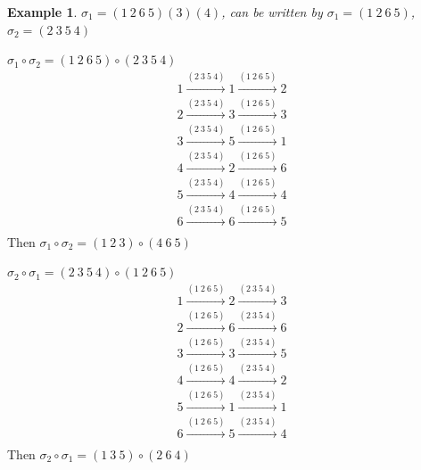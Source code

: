 \documentclass[11pt,a4paper]{article}
\newtheorem{example}{Example}
\begin{document}
\begin{example}
$\sigma_1=(1\ 2\ 6\ 5)(3)(4)$, can be written by $\sigma_1=(1\ 2\ 6\ 5)$, $\sigma_2=(2\ 3\ 5\ 4)$
\end{example}
$\sigma_1 \circ \sigma_2=(1\ 2\ 6\ 5)\circ (2\ 3\ 5\ 4)$
\begin{equation}
    \begin{aligned}
        1 \stackrel{(2\ 3\ 5\ 4)}{\longrightarrow} 1 \stackrel{(1\ 2\ 6\ 5)}{\longrightarrow} 2\\
        2 \stackrel{(2\ 3\ 5\ 4)}{\longrightarrow} 3 \stackrel{(1\ 2\ 6\ 5)}{\longrightarrow} 3\\
        3 \stackrel{(2\ 3\ 5\ 4)}{\longrightarrow} 5 \stackrel{(1\ 2\ 6\ 5)}{\longrightarrow} 1\\
        4 \stackrel{(2\ 3\ 5\ 4)}{\longrightarrow} 2 \stackrel{(1\ 2\ 6\ 5)}{\longrightarrow} 6\\
        5 \stackrel{(2\ 3\ 5\ 4)}{\longrightarrow} 4 \stackrel{(1\ 2\ 6\ 5)}{\longrightarrow} 4\\
        6 \stackrel{(2\ 3\ 5\ 4)}{\longrightarrow} 6 \stackrel{(1\ 2\ 6\ 5)}{\longrightarrow} 5\\
    \end{aligned}
    \nonumber
\end{equation}
Then $\sigma_1 \circ \sigma_2=(1\ 2\ 3)\circ (4\ 6\ 5)$

$\sigma_2 \circ \sigma_1=(2\ 3\ 5\ 4)\circ (1\ 2\ 6\ 5)$
\begin{equation}
    \begin{aligned}
        1 \stackrel{(1\ 2\ 6\ 5)}{\longrightarrow} 2 \stackrel{(2\ 3\ 5\ 4)}{\longrightarrow} 3\\
        2 \stackrel{(1\ 2\ 6\ 5)}{\longrightarrow} 6 \stackrel{(2\ 3\ 5\ 4)}{\longrightarrow} 6\\
        3 \stackrel{(1\ 2\ 6\ 5)}{\longrightarrow} 3 \stackrel{(2\ 3\ 5\ 4)}{\longrightarrow} 5\\
        4 \stackrel{(1\ 2\ 6\ 5)}{\longrightarrow} 4 \stackrel{(2\ 3\ 5\ 4)}{\longrightarrow} 2\\
        5 \stackrel{(1\ 2\ 6\ 5)}{\longrightarrow} 1 \stackrel{(2\ 3\ 5\ 4)}{\longrightarrow} 1\\
        6 \stackrel{(1\ 2\ 6\ 5)}{\longrightarrow} 5 \stackrel{(2\ 3\ 5\ 4)}{\longrightarrow} 4\\
    \end{aligned}
    \nonumber
\end{equation}
Then $\sigma_2 \circ \sigma_1=(1\ 3\ 5)\circ (2\ 6\ 4)$
\end{document}
